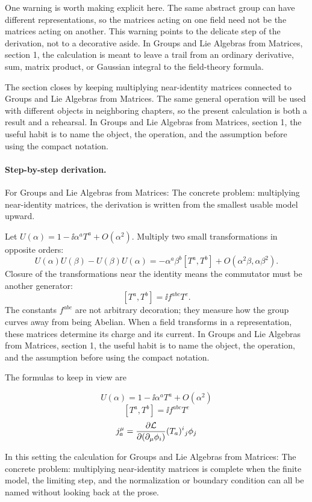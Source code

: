 One warning is worth making explicit here.  The same abstract group can have different representations, so the matrices acting on one field need not be the matrices acting on another.  This warning points to the delicate step of the derivation, not to a decorative aside.  In Groups and Lie Algebras from Matrices, section 1, the calculation is meant to leave a trail from an ordinary derivative, sum, matrix product, or Gaussian integral to the field-theory formula.

The section closes by keeping multiplying near-identity matrices connected to Groups and Lie Algebras from Matrices.  The same general operation will be used with different objects in neighboring chapters, so the present calculation is both a result and a rehearsal.  In Groups and Lie Algebras from Matrices, section 1, the useful habit is to name the object, the operation, and the assumption before using the compact notation.



\paragraph{Step-by-step derivation.}

For Groups and Lie Algebras from Matrices: The concrete problem: multiplying near-identity matrices, the derivation is written from the smallest usable model upward.

Let \(U(\alpha)=1-\ii\alpha^aT^a+O(\alpha^2)\).  Multiply two small transformations in opposite orders:
\[
  U(\alpha)U(\beta)-U(\beta)U(\alpha)
  =
  -\alpha^a\beta^b[T^a,T^b]+O(\alpha^2\beta,\alpha\beta^2).
\]
Closure of the transformations near the identity means the commutator must be another generator:
\[
  [T^a,T^b]=\ii f^{abc}T^c.
\]
The constants \(f^{abc}\) are not arbitrary decoration; they measure how the group curves away from being Abelian.  When a field transforms in a representation, these matrices determine its charge and its current.  In Groups and Lie Algebras from Matrices, section 1, the useful habit is to name the object, the operation, and the assumption before using the compact notation.

The formulas to keep in view are

\[
  U(\alpha)=1-\ii\alpha^aT^a+O(\alpha^2)
\]
\[
  [T^a,T^b]=\ii f^{abc}T^c
\]
\[
  j^\mu_a=\frac{\partial\mathcal L}{\partial(\partial_\mu\phi_i)}(T_a)^i{}_j\phi_j
\]

In this setting the calculation for Groups and Lie Algebras from Matrices: The concrete problem: multiplying near-identity matrices is complete when the finite model, the limiting step, and the normalization or boundary condition can all be named without looking back at the prose.




